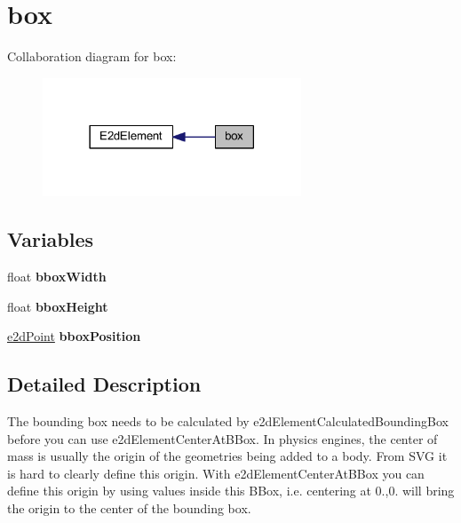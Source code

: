 \hypertarget{group__bounding}{\section{box}
\label{group__bounding}
}
Collaboration diagram for box\-:
\nopagebreak
\begin{figure}[H]
\begin{center}
\leavevmode
\includegraphics[width=218pt]{group__bounding}
\end{center}
\end{figure}
\subsection*{Variables}
\begin{DoxyCompactItemize}
\item 
\hypertarget{group__bounding_ga6a1d9b223870deeaec7f5e8b23ca4b22}{float {\bfseries bbox\-Width}}\label{group__bounding_ga6a1d9b223870deeaec7f5e8b23ca4b22}

\item 
\hypertarget{group__bounding_ga680d0d4219ac8720005c46b55a9676ae}{float {\bfseries bbox\-Height}}\label{group__bounding_ga680d0d4219ac8720005c46b55a9676ae}

\item 
\hypertarget{group__bounding_gac2c17ce4cba805b594b314a77923cbf5}{\hyperlink{structe2d_point}{e2d\-Point} {\bfseries bbox\-Position}}\label{group__bounding_gac2c17ce4cba805b594b314a77923cbf5}

\end{DoxyCompactItemize}


\subsection{Detailed Description}
The bounding box needs to be calculated by e2d\-Element\-Calculated\-Bounding\-Box before you can use e2d\-Element\-Center\-At\-B\-Box. In physics engines, the center of mass is usually the origin of the geometries being added to a body. From S\-V\-G it is hard to clearly define this origin. With e2d\-Element\-Center\-At\-B\-Box you can define this origin by using values inside this B\-Box, i.\-e. centering at 0.,0. will bring the origin to the center of the bounding box. 
